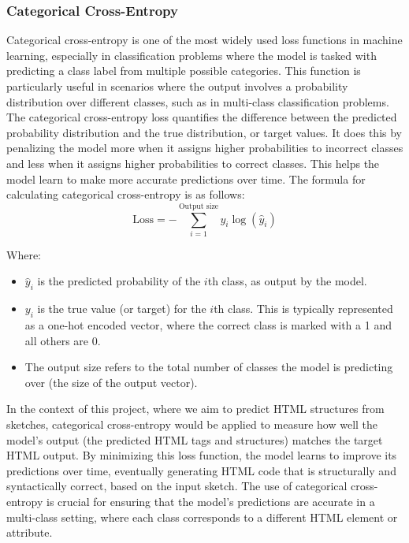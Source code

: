 \subsubsection{Categorical Cross-Entropy}
Categorical cross-entropy is one of the most widely used loss functions in machine learning, especially in classification problems where the model is tasked with predicting a class label from multiple possible categories. This function is particularly useful in scenarios where the output involves a probability distribution over different classes, such as in multi-class classification problems. The categorical cross-entropy loss quantifies the difference between the predicted probability distribution and the true distribution, or target values. It does this by penalizing the model more when it assigns higher probabilities to incorrect classes and less when it assigns higher probabilities to correct classes. This helps the model learn to make more accurate predictions over time.
The formula for calculating categorical cross-entropy is as follows:
\begin{equation}
\text{Loss} = -\sum_{i=1}^{\text{Output size}} y_i \log(\hat{y}_i)
\end{equation}

Where:
\begin{itemize}
    \item \(\hat{y}_i\) is the predicted probability of the \(i\)th class, as output by the model.
    \item \(y_i\) is the true value (or target) for the \(i\)th class. This is typically represented as a one-hot encoded vector, where the correct class is marked with a 1 and all others are 0.
    \item The output size refers to the total number of classes the model is predicting over (the size of the output vector).
\end{itemize}
In the context of this project, where we aim to predict HTML structures from sketches, categorical cross-entropy would be applied to measure how well the model’s output (the predicted HTML tags and structures) matches the target HTML output. By minimizing this loss function, the model learns to improve its predictions over time, eventually generating HTML code that is structurally and syntactically correct, based on the input sketch. The use of categorical cross-entropy is crucial for ensuring that the model's predictions are accurate in a multi-class setting, where each class corresponds to a different HTML element or attribute.

